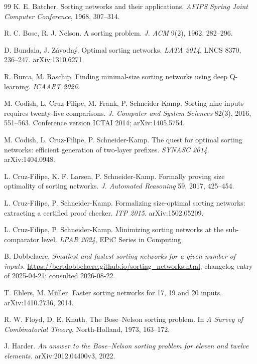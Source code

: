 \documentclass[11pt,a4paper]{article}
\begin{document}
\begin{thebibliography}{99}
\footnotesize
\setlength{\itemsep}{1pt plus 0.5pt}
 K. E. Batcher. Sorting networks and their applications.
\emph{AFIPS Spring Joint Computer Conference}, 1968, 307--314.

 R. C. Bose, R. J. Nelson. A sorting problem.
\emph{J. ACM} 9(2), 1962, 282--296.

 D. Bundala, J. Z\'avodn\'y. Optimal sorting networks.
\emph{LATA 2014}, LNCS 8370, 236--247. arXiv:1310.6271.

 R. Burca, M. Raschip. Finding minimal-size sorting networks using
deep Q-learning. \emph{ICAART 2026}.

 M. Codish, L. Cruz-Filipe, M. Frank, P. Schneider-Kamp.
Sorting nine inputs requires twenty-five comparisons. \emph{J. Computer and
System Sciences} 82(3), 2016, 551--563. Conference version ICTAI 2014;
arXiv:1405.5754.

 M. Codish, L. Cruz-Filipe, P. Schneider-Kamp. The quest for
optimal sorting networks: efficient generation of two-layer prefixes.
\emph{SYNASC 2014}. arXiv:1404.0948.

 L. Cruz-Filipe, K. F. Larsen, P. Schneider-Kamp. Formally
proving size optimality of sorting networks. \emph{J. Automated Reasoning} 59,
2017, 425--454.

 L. Cruz-Filipe, P. Schneider-Kamp. Formalizing size-optimal
sorting networks: extracting a certified proof checker. \emph{ITP 2015}.
arXiv:1502.05209.

 L. Cruz-Filipe, P. Schneider-Kamp. Minimizing sorting networks at
the sub-comparator level. \emph{LPAR 2024}, EPiC Series in Computing.

 B. Dobbelaere. \emph{Smallest and fastest sorting networks for a
given number of inputs.}
\url{https://bertdobbelaere.github.io/sorting_networks.html}; changelog entry of
2025-04-21; consulted 2026-08-22.

 T. Ehlers, M. M\"uller. Faster sorting networks for 17, 19 and 20
inputs. arXiv:1410.2736, 2014.

 R. W. Floyd, D. E. Knuth. The Bose--Nelson sorting problem. In
\emph{A Survey of Combinatorial Theory}, North-Holland, 1973, 163--172.

 J. Harder. \emph{An answer to the Bose--Nelson sorting problem
for eleven and twelve elements.} arXiv:2012.04400v3, 2022.


\end{thebibliography}
\end{document}
